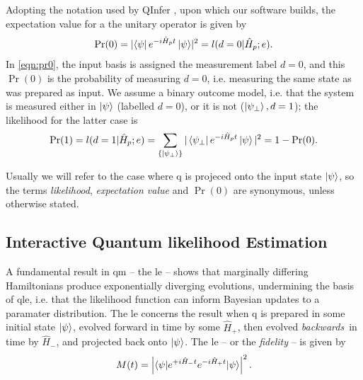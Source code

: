 Adopting the notation used by QInfer \cite{qinfer-1_0}, upon which our software builds, 
    the expectation value for a the unitary operator is given by
\begin{equation}\label{eqn:pr0}
    \Pr(0) =  \lvert \bra{\psi} e^{-i \hat{H}_p t} \ket{\psi}\rvert^2  = l(d=0 | \hat{H}_p; e).
\end{equation}
In \cref{eqn:pr0}, the input basis is assigned the measurement label $d=0$, and this $\Pr(0)$ is the probability 
    of measuring $d=0$, i.e. measuring the same state as was prepared as input. 
We assume a binary outcome model\footnotemark, 
    i.e. that the system is measured either in $\ket{\psi}$ (labelled $d=0$), or it is not ($\ket{\psi_{\perp}}, d=1$);
    the \gls{likelihood} for the latter case is
\begin{equation}\label{eqn:pr1}
    \Pr(1) = l(d=1 | \hat{H}_p; e) = \sum_{\{\ket{\psi_{\perp}}\}} | \bra{\psi_{\perp}} e^{-i \hat{H}_p t} \ket{\psi}  |^2 = 1 - \Pr(0).
\end{equation}

\par 
Usually we will refer to the case where \gls{q} is projeced onto the input state $\ket{\psi}$, 
    so the terms \emph{likelihood}, \emph{expectation value} and \emph{$\Pr(0)$} are synonymous, 
    unless otherwise stated. 


\subsection{Interactive Quantum \gls{likelihood} Estimation}\label{sec:iqle}
A fundamental result in \gls{qm} -- the \gls{le} -- shows that marginally differing Hamiltonians 
    produce exponentially diverging evolutions,  undermining the basis of \gls{qle}, 
    i.e. that the likelihood function can inform Bayesian updates to a paramater distribution. 
The \gls{le} concerns the result when \gls{q} is prepared in some initial state $\ket{\psi}$, 
    evolved forward in time by some $\hat{H}_+$, then evolved \emph{backwards}\footnotemark \ in time by $\hat{H}_{-}$,
    and projected back onto $\ket{\psi}$. 
The \gls{le} -- or the \emph{fidelity} -- is given by 
\begin{equation}
    \label{eqn:loschmidt_echo}
    M(t) = \left\lvert  \braket{ \psi | e^{+i\hat{H}_{-} t} e^{-i \hat{H}_{+} t} | \psi}  \right\rvert^2.
\end{equation}
\par

